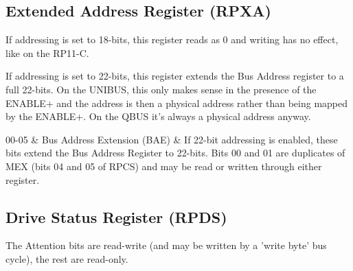 \subsection{Extended Address Register (RPXA)}

\bigskip
If addressing is set to 18-bits, this register reads as 0 and writing has no
effect, like on the RP11-C.

If addressing is set to 22-bits, this register extends the Bus
Address register to a full 22-bits.  On the UNIBUS, this only makes
sense in the presence of the ENABLE+ and the address is then a
physical address rather than being mapped by the ENABLE+. On the QBUS
it's always a physical address anyway.

\begin{register16}
\end{register16}

\begin{bittable}
  00-05 & Bus Address Extension (BAE) & If 22-bit addressing is
  enabled, these bits extend the Bus Address Register to 22-bits.
  Bits 00 and 01 are duplicates of MEX (bits 04 and 05 of RPCS) and
  may be read or written through either register. \\
\end{bittable}

\subsection{Drive Status Register (RPDS)}

\begin{register16}
\end{register16}

The Attention bits are read-write (and may be written by a 'write byte' bus
cycle), the rest are read-only.

